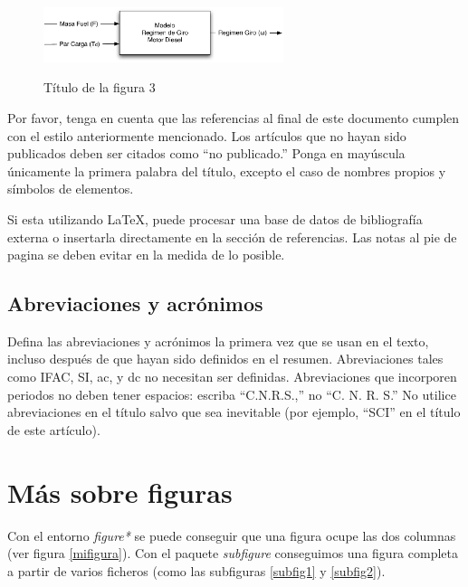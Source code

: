 \documentclass[5p,times,authoryear]{elsarticle}
\begin{document}
\begin{figure}
\centering
  \includegraphics[width=7cm]{Figuras/figurapdf}\\
  \caption{Título de la figura 3}\label{fig3}
\end{figure}

Por favor, tenga en cuenta que las referencias al final de este documento cumplen con el estilo anteriormente mencionado. Los artículos que no hayan sido publicados deben ser citados como ``no publicado.'' Ponga en mayúscula únicamente la primera palabra del título, excepto el caso de nombres propios y símbolos de elementos.

Si esta utilizando LaTeX, puede procesar una base de datos de bibliografía externa o insertarla directamente en la sección de referencias. Las notas al pie de pagina se deben evitar en la medida de lo posible.

\subsection{Abreviaciones y acrónimos}

Defina las abreviaciones y acrónimos la primera vez que se usan en el texto, incluso después de que hayan sido definidos en el resumen. Abreviaciones tales como IFAC, SI, ac, y dc no necesitan ser definidas. Abreviaciones que incorporen periodos no deben tener espacios: escriba ``C.N.R.S.,'' no ``C. N. R. S.'' No utilice abreviaciones en el título salvo que sea inevitable (por ejemplo, ``SCI'' en el título de este artículo).

\section{Más sobre figuras}

Con el entorno \emph{figure*} se puede conseguir que una figura ocupe las dos columnas (ver figura \ref{mifigura}). Con el paquete \emph{subfigure} conseguimos una figura completa a partir de varios ficheros (como las subfiguras \ref{subfig1} y \ref{subfig2}).
\end{document}
